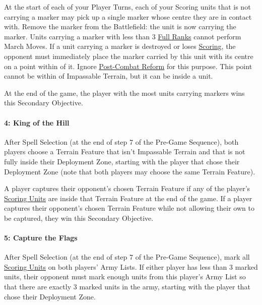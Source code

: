 At the start of each of your Player Turns, each of your Scoring units that is not carrying a marker may pick up a single marker whose centre they are in contact with. Remove the marker from the Battlefield: the unit is now carrying the marker. Units carrying a marker with less than 3 \hyperref[full_ranks]{Full Ranks} cannot perform March Moves. If a unit carrying a marker is destroyed or loses \hyperref[scoring]{Scoring}, the opponent must immediately place the marker carried by this unit with its centre on a point within  of it. Ignore \hyperref[post_combat_reform]{Post-Combat Reform} for this purpose. This point cannot be within  of Impassable Terrain, but it can be inside a unit.

At the end of the game, the player with the most units carrying markers wins this Secondary Objective.

\paragraph{4: King of the Hill}

\newline
After Spell Selection (at the end of step 7 of the Pre-Game Sequence), both players choose a Terrain Feature that isn't Impassable Terrain and that is not fully inside their Deployment Zone, starting with the player that chose their Deployment Zone (note that both players may choose the same Terrain Feature).

A player captures their opponent's chosen Terrain Feature if any of the player's \hyperref[scoring]{Scoring Units} are inside that Terrain Feature at the end of the game. If a player captures their opponent's chosen Terrain Feature while not allowing their own to be captured, they win this Secondary Objective.

\paragraph{5: Capture the Flags}

\newline
After Spell Selection (at the end of step 7 of the Pre-Game Sequence), mark all \hyperref[scoring]{Scoring Units} on both players' Army Lists. If either player has less than 3 marked units, their opponent must mark enough units from this player's Army List so that there are exactly 3 marked units in the army, starting with the player that chose their Deployment Zone.


